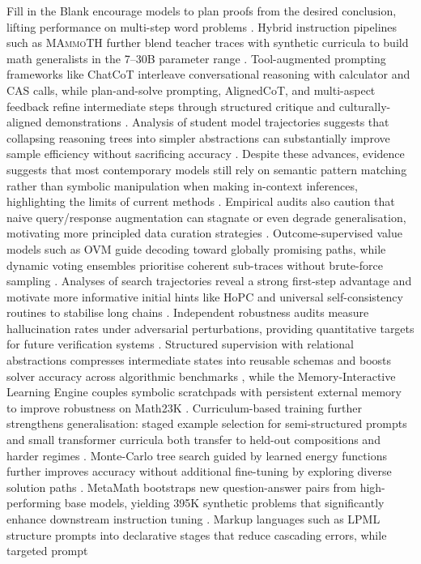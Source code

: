 \documentclass[acmsmall,anonymous]{acmart}
\begin{document}
Fill in the Blank encourage models to plan proofs from the desired conclusion, lifting performance on multi-step word problems \cite{deb-2024-backward-reasoning}.  Hybrid instruction pipelines such as \textsc{MAmmoTH} further blend teacher traces with synthetic curricula to build math generalists in the 7--30B parameter range \cite{yue-2023-mammoth}.  Tool-augmented prompting frameworks like ChatCoT interleave conversational reasoning with calculator and CAS calls, while plan-and-solve prompting, AlignedCoT, and multi-aspect feedback refine intermediate steps through structured critique and culturally-aligned demonstrations \cite{chen-2023-chatcot,wang-2023-plan-and-solve,yang-2024-alignedcot,nathani-2023-maf}.  Analysis of student model trajectories suggests that collapsing reasoning trees into simpler abstractions can substantially improve sample efficiency without sacrificing accuracy \cite{yan2023complexsimpleunravelingcognitive}.  Despite these advances, evidence suggests that most contemporary models still rely on semantic pattern matching rather than symbolic manipulation when making in-context inferences, highlighting the limits of current methods \cite{tang2023largelanguagemodelsincontext}.  Empirical audits also caution that naive query/response augmentation can stagnate or even degrade generalisation, motivating more principled data curation strategies \cite{zhang-2024-query-augmentation,li-2024-mugglemath}.  Outcome-supervised value models such as OVM guide decoding toward globally promising paths, while dynamic voting ensembles prioritise coherent sub-traces without brute-force sampling \cite{yu2024ovmoutcomesupervisedvaluemodels,xue-2023-dynamic-voting}.  Analyses of search trajectories reveal a strong first-step advantage and motivate more informative initial hints like HoPC and universal self-consistency routines to stabilise long chains \cite{jain2024firststepadvantageimportancestarting,lei2025hintpseudocodehopc,chen2023universalselfconsistencylargelanguage}.  Independent robustness audits measure hallucination rates under adversarial perturbations, providing quantitative targets for future verification systems \cite{qian-2024-hallucination-eval}.  Structured supervision with relational abstractions compresses intermediate states into reusable schemas and boosts solver accuracy across algorithmic benchmarks \cite{nam-2022-relational-abstractions}, while the Memory-Interactive Learning Engine couples symbolic scratchpads with persistent external memory to improve robustness on Math23K \cite{wu-2022-mile}.  Curriculum-based training further strengthens generalisation: staged example selection for semi-structured prompts and small transformer curricula both transfer to held-out compositions and harder regimes \cite{nam-2022-ood-curriculum,nam-2022-ood-transformers}. Monte-Carlo tree search guided by learned energy functions further improves accuracy without additional fine-tuning by exploring diverse solution paths \cite{xu-2023-no-train}.  MetaMath bootstraps new question-answer pairs from high-performing base models, yielding 395K synthetic problems that significantly enhance downstream instruction tuning \cite{yu-2024-metamath}. Markup languages such as LPML structure prompts into declarative stages that reduce cascading errors, while targeted prompt 
\end{document}
